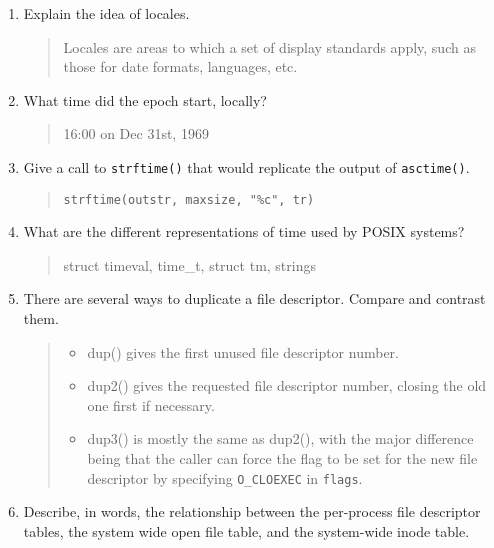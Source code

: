 \documentclass[letterpaper,10pt,onecolumn,titlepage]{article}
\begin{document}
\begin{enumerate}
\item Explain the idea of locales.

\begin{quote}
    Locales are areas to which a set of display standards apply, such as those for date formats, languages, etc.
\end{quote}

\item What time did the epoch start, locally?

\begin{quote}
16:00 on Dec 31st, 1969
\end{quote}

\item Give a call to \texttt{strftime()} that would replicate the output of
  \texttt{asctime()}.

\begin{quote}
    \texttt{strftime(outstr, maxsize, "\%c", tr)}
\end{quote}

\item What are the different representations of time used by POSIX systems?

\begin{quote}
    struct timeval, time\_t, struct tm, strings
\end{quote}

\item There are several ways to duplicate a file descriptor. Compare and contrast them.

\begin{quote}
\begin{itemize}
    \item dup() gives the first unused file descriptor number.
    \item dup2() gives the requested file descriptor number, closing the old one first if necessary.
    \item dup3() is mostly the same as dup2(), with the major difference being that the caller can force the flag to be set for the new file descriptor by specifying \texttt{O\_CLOEXEC} in \texttt{flags}.
\end{itemize}
\end{quote}

\item \label{last} Describe, in words, the relationship between the per-process file
  descriptor tables, the system wide open file table, and the system-wide inode table.

\begin{quote}

\end{quote}

\end{enumerate}

\end{document}
